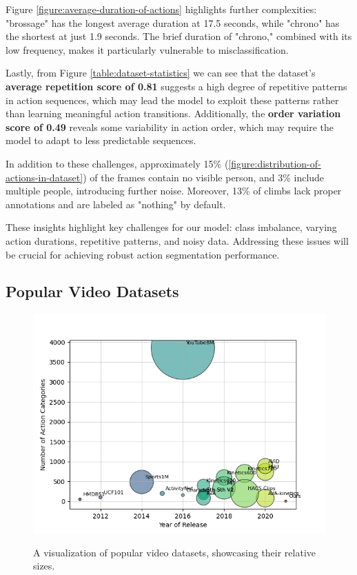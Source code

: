 Figure \ref{figure:average-duration-of-actions} highlights further complexities: "brossage" has the longest average duration at 17.5 seconds, while "chrono" has the shortest at just 1.9 seconds. The brief duration of "chrono," combined with its low frequency, makes it particularly vulnerable to misclassification.

Lastly, from Figure \ref{table:dataset-statistics} we can see that the dataset's \textbf{average repetition score of 0.81} suggests a high degree of repetitive patterns in action sequences, which may lead the model to exploit these patterns rather than learning meaningful action transitions. Additionally, the \textbf{order variation score of 0.49} reveals some variability in action order, which may require the model to adapt to less predictable sequences.

In addition to these challenges, approximately 15\% (\ref{figure:distribution-of-actions-in-dataset}) of the frames contain no visible person, and 3\% include multiple people, introducing further noise. Moreover, 13\% of climbs lack proper annotations and are labeled as "nothing" by default.

These insights highlight key challenges for our model: class imbalance, varying action durations, repetitive patterns, and noisy data. Addressing these issues will be crucial for achieving robust action segmentation performance.

\subsection{Popular Video Datasets}

\label{subsection:popular-video-datasets}

\begin{figure}[h!]
    \centering
    \includegraphics[width=1\linewidth]{../../assets/figures/popular-datasets.png}
    \caption{A visualization of popular video datasets, showcasing their relative sizes.}
    \label{figure:popular-datasets-visualization}
    \cite{video-action-recognition-study}
\end{figure}


